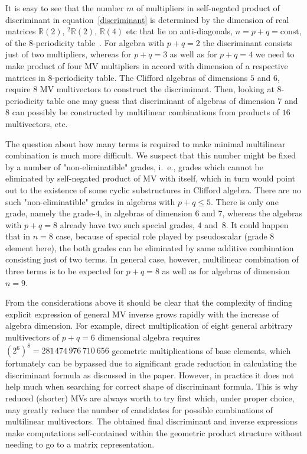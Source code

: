 \documentclass{birkjour}
\begin{document}
It is easy to see that the number $m$ of multipliers in
self-negated product of discriminant in
equation~\eqref{discriminant} is determined by the dimension of
real matrices $\mathbb{R}(2)$, ${^2\mathbb{R}(2)}$,
$\mathbb{R}(4)$ etc that lie on anti-diagonals,
$n=p+q=\mathrm{const}$, of the 8-periodicity
table~\cite{Lounesto97}. For algebra with $p+q=2$ the discriminant
consists just of two multipliers, whereas for $p+q=3$ as well as
for $p+q=4$ we need to make product of four MV multipliers in
accord with dimension of a respective matrices in 8-periodicity
table. The Clifford algebras of dimensions $5$ and $6$, require
$8$ MV multivectors to construct the discriminant. Then, looking
at $8$-periodicity table one may guess that discriminant of
algebras of dimension $7$ and $8$ can possibly be constructed by
multilinear combinations from products of $16$ multivectors, etc.

The question about how many terms is required to make minimal
multilinear combination is much more difficult. We suspect that
this number might be fixed by a number of "non-eliminatible"
grades, i.~e., grades which cannot be eliminated by self-negated
product of MV with itself, which in turn would point out to the
existence of some cyclic substructures in Clifford algebra. There
are no such "non-eliminatible" grades in algebras with $p+q\le 5$.
There is only one grade, namely the grade-$4$, in algebras of
dimension $6$ and $7$, whereas the algebras with $p+q =8$ already
have two such special grades, $4$ and~$8$. It could happen that in $n=8$ case,
because of special role played by pseudoscalar (grade $8$ element
here), the both grades can be eliminated by same additive
combination consisting just of two terms. In general case,
however, multilinear combination of three terms is to be expected
for $p+q =8$ as well as for algebras of dimension~$n=9$.

From the considerations above it should be  clear that the
complexity of finding explicit expression of general MV inverse grows
rapidly with the increase of algebra dimension. For example,
direct multiplication of eight general arbitrary multivectors of
$p+q=6$ dimensional algebra requires
$(2^6)^8=281\mspace{2mu}474\mspace{3mu}976\mspace{3mu}710\mspace{4mu}656$
geometric multiplications of base elements, which fortunately can
be bypassed due to significant grade reduction in calculating the
discriminant formula as discussed in the paper. However, in
practice it does not help much when searching for correct shape of
discriminant formula. This is why reduced (shorter) MVs are always worth
to try first which, under proper choice, may greatly reduce the
number of candidates for possible combinations of multilinear
multivectors. The obtained final discriminant and inverse expressions make computations self-contained within the geometric product structure without needing to go to a matrix representation.
\end{document}
